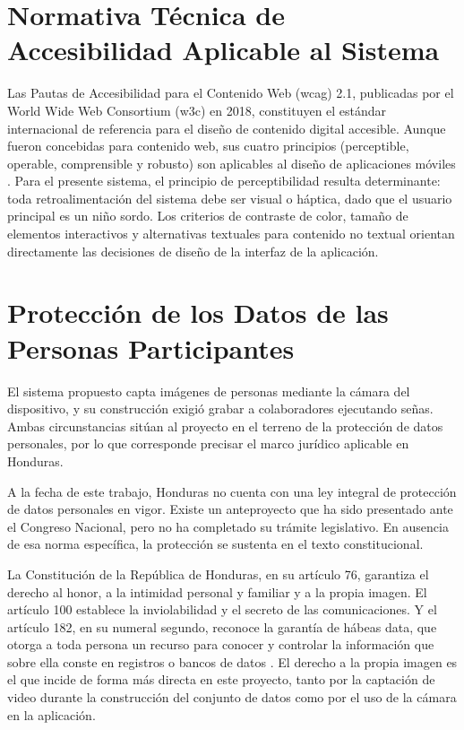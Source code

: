 \section{Normativa Técnica de Accesibilidad Aplicable al Sistema}

Las Pautas de Accesibilidad para el Contenido Web (\acrshort{wcag}) 2.1, publicadas por el World Wide
Web Consortium (\acrshort{w3c}) en 2018, constituyen el estándar internacional de referencia para el
diseño de contenido digital accesible. Aunque fueron concebidas para contenido web, sus
cuatro principios (perceptible, operable, comprensible y robusto) son aplicables al diseño
de aplicaciones móviles \cite{w3c_wcag_2018}. Para el presente sistema, el principio de
perceptibilidad resulta determinante: toda retroalimentación del sistema debe ser visual o
háptica, dado que el usuario principal es un niño sordo. Los criterios de contraste de
color, tamaño de elementos interactivos y alternativas textuales para contenido no textual
orientan directamente las decisiones de diseño de la interfaz de la aplicación.

\section{Protección de los Datos de las Personas Participantes}

El sistema propuesto capta imágenes de personas mediante la cámara del dispositivo, y su
construcción exigió grabar a colaboradores ejecutando señas. Ambas circunstancias sitúan
al proyecto en el terreno de la protección de datos personales, por lo que corresponde
precisar el marco jurídico aplicable en Honduras.

A la fecha de este trabajo, Honduras no cuenta con una ley integral de protección de datos
personales en vigor. Existe un anteproyecto que ha sido presentado ante el Congreso
Nacional, pero no ha completado su trámite legislativo. En ausencia de esa norma
específica, la protección se sustenta en el texto constitucional.

La Constitución de la República de Honduras, en su artículo 76, garantiza el derecho al
honor, a la intimidad personal y familiar y a la propia imagen. El artículo 100 establece
la inviolabilidad y el secreto de las comunicaciones. Y el artículo 182, en su numeral
segundo, reconoce la garantía de hábeas data, que otorga a toda persona un recurso para
conocer y controlar la información que sobre ella conste en registros o bancos de datos
\cite{constitucion_honduras_1982}. El derecho a la propia imagen es el que incide de forma
más directa en este proyecto, tanto por la captación de video durante la construcción del
conjunto de datos como por el uso de la cámara en la aplicación.

